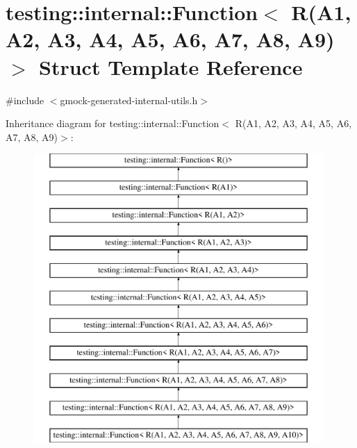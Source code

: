 \hypertarget{structtesting_1_1internal_1_1Function_3_01R_07A1_00_01A2_00_01A3_00_01A4_00_01A5_00_01A6_00_01A7_00_01A8_00_01A9_08_4}{}\section{testing\+::internal\+::Function$<$ R(A1, A2, A3, A4, A5, A6, A7, A8, A9)$>$ Struct Template Reference}
\label{structtesting_1_1internal_1_1Function_3_01R_07A1_00_01A2_00_01A3_00_01A4_00_01A5_00_01A6_00_01A7_00_01A8_00_01A9_08_4}


{\ttfamily \#include $<$gmock-\/generated-\/internal-\/utils.\+h$>$}

Inheritance diagram for testing\+::internal\+::Function$<$ R(A1, A2, A3, A4, A5, A6, A7, A8, A9)$>$\+:\begin{figure}[H]
\begin{center}
\leavevmode
\includegraphics[height=11.000000cm]{structtesting_1_1internal_1_1Function_3_01R_07A1_00_01A2_00_01A3_00_01A4_00_01A5_00_01A6_00_01A7_00_01A8_00_01A9_08_4}
\end{center}
\end{figure}
